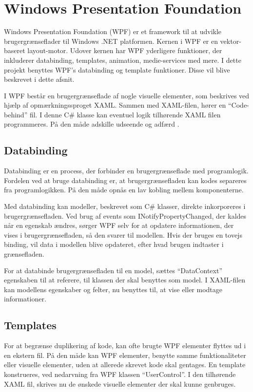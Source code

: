 \section{Windows Presentation Foundation}
\label{sec:wpf}

Windows Presentation Foundation (WPF) er et framework til at udvikle brugergrænseflader til Windows .NET platformen. Kernen i WPF er en vektor-baseret layout-motor. Udover kernen har WPF yderligere funktioner, der inkluderer databinding, templates, animation, medie-services med mere. I dette projekt benyttes WPF's databinding og template funktioner. Disse vil blive beskrevet i dette afsnit.

I WPF består en brugergrænseflade af nogle visuelle elementer, som beskrives ved hjælp af opmærkningssproget XAML. Sammen med XAML-filen, hører en \enquote{Code-behind} fil. I denne C\# klasse kan eventuel logik tilhørende XAML filen programmeres. På den måde adskille udseende og adfærd \cite{microsoft_wpf}.

\subsection{Databinding}

Databinding er en process, der forbinder en brugergrænseflade med programlogik. Fordelen ved at bruge databinding er, at brugergrænsefladen kan kodes separeres fra programlogikken. På den måde opnås en lav kobling mellem komponenterne.

Med databinding kan modeller, beskrevet som C\# klasser, direkte inkorporeres i brugergrænsefladen. Ved brug af events som INotifyPropertyChanged, der kaldes når en egenskab ændres, sørger WPF selv for at opdatere informationen, der vises i brugergrænsefladen, så den svarer til modellen. Hvis der bruges en tovejs binding, vil data i modellen blive opdateret, efter hvad brugen indtaster i grænsefladen.

For at databinde brugergrænsefladen til en model, sættes \enquote{DataContext} egenskaben til at referere, til klassen der skal benyttes som model. I XAML-filen kan modellens egenskaber og felter, nu benyttes til, at vise eller modtage informationer.

\subsection{Templates}

For at begrænse duplikering af kode, kan ofte brugte WPF elementer flyttes ud i en ekstern fil. På den måde kan WPF elementer, benytte samme funktionaliteter eller visuelle elementer, uden at allerede skrevet kode skal gentages. En template konstrueres, ved nedarvning fra WPF klassen \enquote{UserControl}. I den tilhørende XAML fil, skrives nu de ønskede visuelle elementer der skal kunne genbruges.
